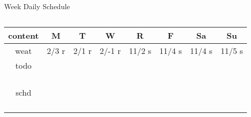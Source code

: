 \begin{columns}
\begin{column}{0.5\linewidth}
{\begin{block}{Week Daily Schedule}
\begin{columns}
        \end{columns}
      \end{block}

}
 

\begin{table}[ht!]
\label{fig:calendar}
\begin{center}
\begin{tabular}
{ | c || c | c | c | c | c | c | c |}
\hline
  \textbf{\small content} & {\small \bf M} & {\small \bf T} & {\small
    \bf W} & {\small \bf R} & {\small \bf F} & {\small \bf Sa} &
         {\small \bf Su} \\
  \hline
  \small weat  &\tiny 2/3 r &\tiny 2/1 r &\tiny 2/-1 r &\tiny 11/2 s  &\tiny 11/4 s   &\tiny  11/4 s &\tiny 11/5 s \\
  \hline
  \small todo  &\small &\small &\small &\small &\small &\small
  &\small  \\
  \small       &\small &\small &\small &\small &\small &\small
  &\small  \\
  \small       &\small &\small &\small &\small &\small &\small
  &\small  \\
  \small       &\small &\small &\small &\small &\small &\small
  &\small  \\
  \small       &\small &\small &\small &\small &\small &\small
  &\small  \\
  \hline
  \small schd  &\small &\small &\small &\small &\small &\small &\small  \\
  \small     &\small &\small &\small &\small &\small &\small  &\small
  \\
  \small      &\small &\small &\small &\small &\small &\small  &\small
  \\
  \small    &\small &\small &\small &\small &\small &\small  &\small
  \\
  \small     &\small &\small &\small &\small &\small &\small &\small
  \\
  \hline
\end{tabular}
\end{center}
\end{table}

  \end{column}





\end{columns}
